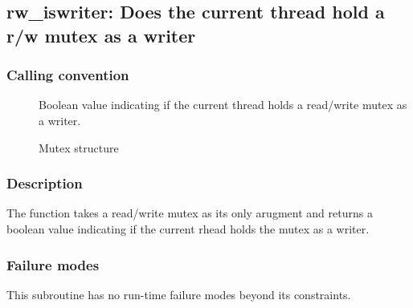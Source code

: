 \clearpage
{}
{}
\label{subr:rw_iswriter}
\subsection*{rw\_iswriter: Does the current thread hold a r/w mutex as
  a writer}

\subsubsection*{Calling convention}

\begin{description}
\item[] Boolean value indicating if the current thread
  holds a read/write mutex as a writer.
\item[] Mutex structure
\end{description}

\subsubsection*{Description}

The  function takes a read/write mutex as its
only arugment and returns a boolean value indicating if the current
rhead holds the mutex as a writer.

\subsubsection*{Failure modes}

This subroutine has no run-time failure modes beyond its constraints.
